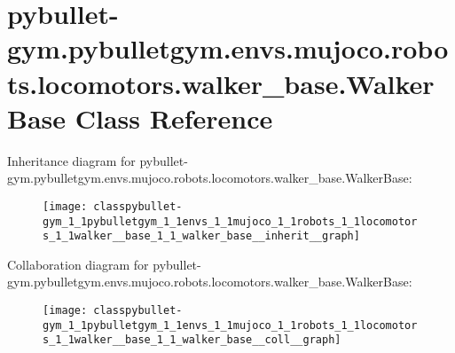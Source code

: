 \hypertarget{classpybullet-gym_1_1pybulletgym_1_1envs_1_1mujoco_1_1robots_1_1locomotors_1_1walker__base_1_1_walker_base}{}\section{pybullet-\/gym.pybulletgym.\+envs.\+mujoco.\+robots.\+locomotors.\+walker\+\_\+base.\+Walker\+Base Class Reference}
\label{classpybullet-gym_1_1pybulletgym_1_1envs_1_1mujoco_1_1robots_1_1locomotors_1_1walker__base_1_1_walker_base}


Inheritance diagram for pybullet-\/gym.pybulletgym.\+envs.\+mujoco.\+robots.\+locomotors.\+walker\+\_\+base.\+Walker\+Base\+:
\nopagebreak
\begin{figure}[H]
\begin{center}
\leavevmode
\texttt{[image: classpybullet-gym\_1\_1pybulletgym\_1\_1envs\_1\_1mujoco\_1\_1robots\_1\_1locomotors\_1\_1walker\_\_base\_1\_1\_walker\_base\_\_inherit\_\_graph]}
\end{center}
\end{figure}


Collaboration diagram for pybullet-\/gym.pybulletgym.\+envs.\+mujoco.\+robots.\+locomotors.\+walker\+\_\+base.\+Walker\+Base\+:
\nopagebreak
\begin{figure}[H]
\begin{center}
\leavevmode
\texttt{[image: classpybullet-gym\_1\_1pybulletgym\_1\_1envs\_1\_1mujoco\_1\_1robots\_1\_1locomotors\_1\_1walker\_\_base\_1\_1\_walker\_base\_\_coll\_\_graph]}
\end{center}
\end{figure}
